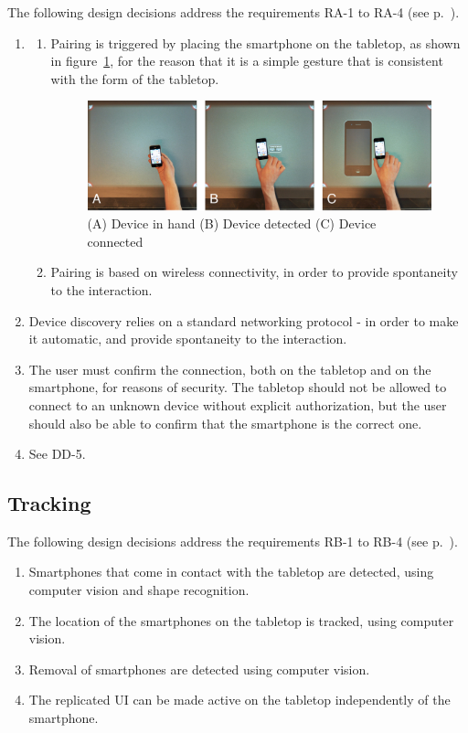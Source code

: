 The following design decisions address the requirements RA-1 to RA-4 (see p.~\pageref{RA}).

\begin{enumerate}[{DA}-1]
\item \hfill
	\begin{enumerate}[{DA-1}a]
	\item Pairing is triggered by placing the smartphone on the tabletop, as shown in figure~\ref{fig:sqPair}, for the reason that it is a simple gesture that is consistent with the form of the tabletop.

\begin{figure}[htb]
  \centering
    \includegraphics[width=0.7\linewidth]{images/sqPair}
  \caption{(A) Device in hand (B) Device detected (C) Device connected}
  \label{fig:sqPair}
\end{figure}

	\item Pairing is based on wireless connectivity, in order to provide spontaneity to the interaction.
	\end{enumerate}
\item Device discovery relies on a standard networking protocol - in order to make it automatic, and provide spontaneity to the interaction.
\item The user must confirm the connection, both on the tabletop and on the smartphone, for reasons of security.
The tabletop should not be allowed to connect to an unknown device without explicit authorization, but the user should also be able to confirm that the smartphone is the correct one.
\item See DD-5.
\end{enumerate}

\subsection{Tracking}

The following design decisions address the requirements RB-1 to RB-4 (see p.~\pageref{RB}).

\label{DB}
\begin{enumerate}[{DB}-1]
\item Smartphones that come in contact with the tabletop are detected, using computer vision and shape recognition.
\item The location of the smartphones on the tabletop is tracked, using computer vision.
\item Removal of smartphones are detected using computer vision.
\item The replicated UI can be made active on the tabletop independently of the smartphone.
\end{enumerate}

